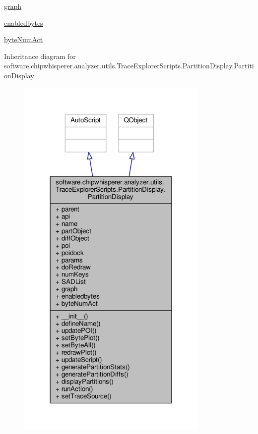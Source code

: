 \begin{DoxyCompactItemize}
\item 
\hyperlink{classsoftware_1_1chipwhisperer_1_1analyzer_1_1utils_1_1TraceExplorerScripts_1_1PartitionDisplay_1_1PartitionDisplay_ac0d668dfc4c5f67c8ae4b60eb07c18e7}{graph}
\item 
\hyperlink{classsoftware_1_1chipwhisperer_1_1analyzer_1_1utils_1_1TraceExplorerScripts_1_1PartitionDisplay_1_1PartitionDisplay_a64d82c9bb535b3e6468f194c1a85e988}{enabledbytes}
\item 
\hyperlink{classsoftware_1_1chipwhisperer_1_1analyzer_1_1utils_1_1TraceExplorerScripts_1_1PartitionDisplay_1_1PartitionDisplay_a8235c0d178d636290bb092c6dae8d893}{byte\+Num\+Act}
\end{DoxyCompactItemize}


Inheritance diagram for software.\+chipwhisperer.\+analyzer.\+utils.\+Trace\+Explorer\+Scripts.\+Partition\+Display.\+Partition\+Display\+:\nopagebreak
\begin{figure}[H]
\begin{center}
\leavevmode
\includegraphics[width=263pt]{da/d8c/classsoftware_1_1chipwhisperer_1_1analyzer_1_1utils_1_1TraceExplorerScripts_1_1PartitionDisplay_b4be10ab4e5fa1f2ad72f34f5bb032e0}
\end{center}
\end{figure}



